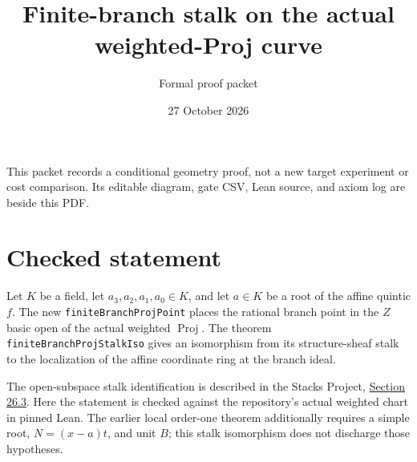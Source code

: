 \documentclass[11pt]{article}
\title{Finite-branch stalk on the actual weighted-Proj curve}
\author{Formal proof packet}
\date{27 October 2026}
\begin{document}
\maketitle
\noindent This packet records a conditional geometry proof, not a new target experiment or cost comparison. Its editable diagram, gate CSV, Lean source, and axiom log are beside this PDF.

\section*{Checked statement}
Let $K$ be a field, let $a_3,a_2,a_1,a_0\in K$, and let $a\in K$ be a root of the affine quintic $f$. The new \texttt{finiteBranchProjPoint} places the rational branch point in the $Z$ basic open of the actual weighted $\operatorname{Proj}$. The theorem \texttt{finiteBranchProjStalkIso} gives an isomorphism from its structure-sheaf stalk to the localization of the affine coordinate ring at the branch ideal.

\begin{center}
\setlength{\fboxsep}{8pt}
\end{center}

The open-subspace stalk identification is described in the Stacks Project, \href{https://stacks.math.columbia.edu/tag/01HD}{Section 26.3}. Here the statement is checked against the repository's actual weighted chart in pinned Lean. The earlier local order-one theorem additionally requires a simple root, $N=(x-a)t$, and unit $B$; this stalk isomorphism does not discharge those hypotheses.
\end{document}
